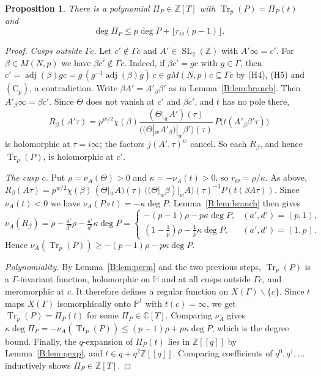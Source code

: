 \documentclass[11pt,a4paper]{article}
\newtheorem{proposition}[theorem]{Proposition}
\theoremstyle{definition}\newtheorem{definition}[theorem]{Definition}
\theoremstyle{remark}\newtheorem{remark}[theorem]{Remark}
\newcommand{\Z}{\mathbb Z}
\newcommand{\C}{\mathbb C}
\newcommand{\Hb}{\mathbb H}
\DeclareMathOperator{\Tr}{Tr}
\DeclareMathOperator{\SL}{SL}
\DeclareMathOperator{\adj}{adj}
\numberwithin{equation}{section}
\begin{document}
\begin{proposition}\label{B:prop:poly}
There is a polynomial $\Pi_P\in\Z[T]$ with $\Tr_p(P)=\Pi_P(t)$ and
\[
\deg\Pi_P\le p\deg P+\lfloor r_\Theta(p-1)\rfloor .
\]
\end{proposition}
\begin{proof}
\emph{Cusps outside $\Gamma c$.} Let $c'\notin\Gamma c$ and $A'\in\SL_2(\Z)$ with $A'\infty=c'$. For
$\beta\in M(N,p)$ we have $\beta c'\notin\Gamma c$. Indeed, if $\beta c'=gc$ with $g\in\Gamma$, then
$c'=\adj(\beta)gc=g\,(g^{-1}\adj(\beta)g)\,c\in gM(N,p)c\subseteq\Gamma c$ by (H4), (H5) and
$(\mathrm C_p)$, a contradiction. Write $\beta A'=A'_\beta\beta'$ as in Lemma~\ref{B:lem:branch}. Then
$A'_\beta\infty=\beta c'$. Since $\Theta$ does not vanish at $c'$ and $\beta c'$, and $t$ has no pole there,
\[
R_\beta(A'\tau)=p^{w/2}\chi(\beta)\frac{(\Theta|_wA')(\tau)}{\bigl((\Theta|_wA'_\beta)|_w\beta'\bigr)(\tau)}
\,P\bigl(t(A'_\beta\beta'\tau)\bigr)
\]
is holomorphic at $\tau=i\infty$; the factors $j(A',\tau)^w$ cancel. So each $R_\beta$, and hence $\Tr_p(P)$, is holomorphic at $c'$.

\emph{The cusp $c$.} Put $\rho=\nu_A(\Theta)>0$ and $\kappa=-\nu_A(t)>0$, so $r_\Theta=\rho/\kappa$.
As above, $R_\beta(A\tau)=p^{w/2}\chi(\beta)\,(\Theta|_wA)(\tau)\,
\bigl((\Theta|_w\beta)|_wA\bigr)(\tau)^{-1}P(t(\beta A\tau))$. Since $\nu_A(t)<0$ we have
$\nu_A(P\circ t)=-\kappa\deg P$. Lemma~\ref{B:lem:branch} then gives
\[
\nu_A(R_\beta)=\rho-\tfrac{a'}{d'}\rho-\tfrac{a'}{d'}\kappa\deg P=
\begin{cases}
-(p-1)\rho-p\kappa\deg P, & (a',d')=(p,1),\\
(1-\frac1p)\rho-\frac1p\kappa\deg P, & (a',d')=(1,p).
\end{cases}
\]
Hence $\nu_A(\Tr_p(P))\ge-(p-1)\rho-p\kappa\deg P$.

\emph{Polynomiality.} By Lemma~\ref{B:lem:perm} and the two previous steps, $\Tr_p(P)$ is a
$\Gamma$-invariant function, holomorphic on $\Hb$ and at all cusps outside $\Gamma c$, and
meromorphic at $c$. It therefore defines a regular function on $X(\Gamma)\smallsetminus\{c\}$.
Since $t$ maps $X(\Gamma)$ isomorphically onto $\mathbb P^1$ with $t(c)=\infty$, we get
$\Tr_p(P)=\Pi_P(t)$ for some $\Pi_P\in\C[T]$. Comparing $\nu_A$ gives
$\kappa\deg\Pi_P=-\nu_A(\Tr_p(P))\le(p-1)\rho+p\kappa\deg P$, which is the degree bound. Finally, the
$q$-expansion of $\Pi_P(t)$ lies in $\Z[[q]]$ by Lemma~\ref{B:lem:qexp}, and $t\in q+q^2\Z[[q]]$.
Comparing coefficients of $q^0,q^1,\dots$ inductively shows $\Pi_P\in\Z[T]$.
\end{proof}
\end{document}
